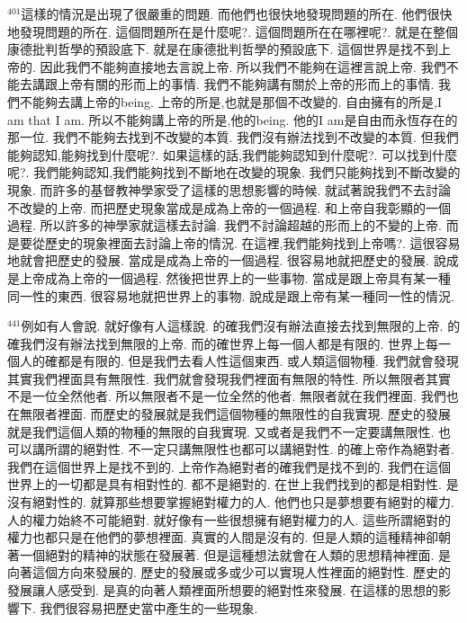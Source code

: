 \documentclass{book}
\begin{document}
$^{401}$這樣的情況是出現了很嚴重的問題.
而他們也很快地發現問題的所在.
他們很快地發現問題的所在.
這個問題所在是什麼呢?.
這個問題所在在哪裡呢?.
就是在整個康德批判哲學的預設底下.
就是在康德批判哲學的預設底下.
這個世界是找不到上帝的.
因此我們不能夠直接地去言說上帝.
所以我們不能夠在這裡言說上帝.
我們不能去講跟上帝有關的形而上的事情.
我們不能夠講有關於上帝的形而上的事情.
我們不能夠去講上帝的being.
上帝的所是,也就是那個不改變的.
自由擁有的所是,I am that I am.
所以不能夠講上帝的所是,他的being.
他的I am是自由而永恆存在的那一位.
我們不能夠去找到不改變的本質.
我們沒有辦法找到不改變的本質.
但我們能夠認知,能夠找到什麼呢?.
如果這樣的話,我們能夠認知到什麼呢?.
可以找到什麼呢?.
我們能夠認知,我們能夠找到不斷地在改變的現象.
我們只能夠找到不斷改變的現象.
而許多的基督教神學家受了這樣的思想影響的時候.
就試著說我們不去討論不改變的上帝.
而把歷史現象當成是成為上帝的一個過程.
和上帝自我彰顯的一個過程.
所以許多的神學家就這樣去討論.
我們不討論超越的形而上的不變的上帝.
而是要從歷史的現象裡面去討論上帝的情況.
在這裡,我們能夠找到上帝嗎?.
這很容易地就會把歷史的發展.
當成是成為上帝的一個過程.
很容易地就把歷史的發展.
說成是上帝成為上帝的一個過程.
然後把世界上的一些事物.
當成是跟上帝具有某一種同一性的東西.
很容易地就把世界上的事物.
說成是跟上帝有某一種同一性的情況.

$^{441}$例如有人會說.
就好像有人這樣說.
的確我們沒有辦法直接去找到無限的上帝.
的確我們沒有辦法找到無限的上帝.
而的確世界上每一個人都是有限的.
世界上每一個人的確都是有限的.
但是我們去看人性這個東西.
或人類這個物種.
我們就會發現其實我們裡面具有無限性.
我們就會發現我們裡面有無限的特性.
所以無限者其實不是一位全然他者.
所以無限者不是一位全然的他者.
無限者就在我們裡面.
我們也在無限者裡面.
而歷史的發展就是我們這個物種的無限性的自我實現.
歷史的發展就是我們這個人類的物種的無限的自我實現.
又或者是我們不一定要講無限性.
也可以講所謂的絕對性.
不一定只講無限性也都可以講絕對性.
的確上帝作為絕對者.
我們在這個世界上是找不到的.
上帝作為絕對者的確我們是找不到的.
我們在這個世界上的一切都是具有相對性的.
都不是絕對的.
在世上我們找到的都是相對性.
是沒有絕對性的.
就算那些想要掌握絕對權力的人.
他們也只是夢想要有絕對的權力.
人的權力始終不可能絕對.
就好像有一些很想擁有絕對權力的人.
這些所謂絕對的權力也都只是在他們的夢想裡面.
真實的人間是沒有的.
但是人類的這種精神卻朝著一個絕對的精神的狀態在發展著.
但是這種想法就會在人類的思想精神裡面.
是向著這個方向來發展的.
歷史的發展或多或少可以實現人性裡面的絕對性.
歷史的發展讓人感受到.
是真的向著人類裡面所想要的絕對性來發展.
在這樣的思想的影響下.
我們很容易把歷史當中產生的一些現象.
\end{document}
